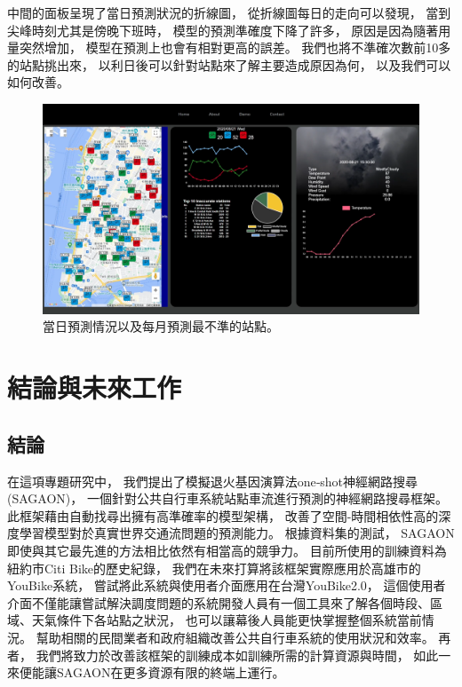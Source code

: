 \documentclass[a4paper,12pt]{extarticle}
\begin{document}
            中間的面板呈現了當日預測狀況的折線圖，
            從折線圖每日的走向可以發現，
            當到尖峰時刻尤其是傍晚下班時，
            模型的預測準確度下降了許多，
            原因是因為隨著用量突然增加，
            模型在預測上也會有相對更高的誤差。
            我們也將不準確次數前10多的站點挑出來，
            以利日後可以針對站點來了解主要造成原因為何，
            以及我們可以如何改善。
            \begin{figure}[htbp]
                \centering
                \includegraphics[width=\textwidth]{details.png}
                \caption{
                    當日預測情況以及每月預測最不準的站點。
                }
                \label{fig:details}
            \end{figure}

    \newpage
    \section{結論與未來工作}
        \subsection{結論}
        在這項專題研究中，
        我們提出了模擬退火基因演算法one‑shot神經網路搜尋(SAGAON)，
        一個針對公共自行車系統站點車流進行預測的神經網路搜尋框架。
        此框架藉由自動找尋出擁有高準確率的模型架構，
        改善了空間-時間相依性高的深度學習模型對於真實世界交通流問題的預測能力。
        根據資料集的測試，
        SAGAON即使與其它最先進的方法相比依然有相當高的競爭力。
        目前所使用的訓練資料為紐約市Citi Bike的歷史紀錄，
        我們在未來打算將該框架實際應用於高雄市的YouBike系統，
        嘗試將此系統與使用者介面應用在台灣YouBike2.0，
        這個使用者介面不僅能讓嘗試解決調度問題的系統開發人員有一個工具來了解各個時段、區域、天氣條件下各站點之狀況，
        也可以讓幕後人員能更快掌握整個系統當前情況。
        幫助相關的民間業者和政府組織改善公共自行車系統的使用狀況和效率。
        再者，
        我們將致力於改善該框架的訓練成本如訓練所需的計算資源與時間，
        如此一來便能讓SAGAON在更多資源有限的終端上運行。
\end{document}
